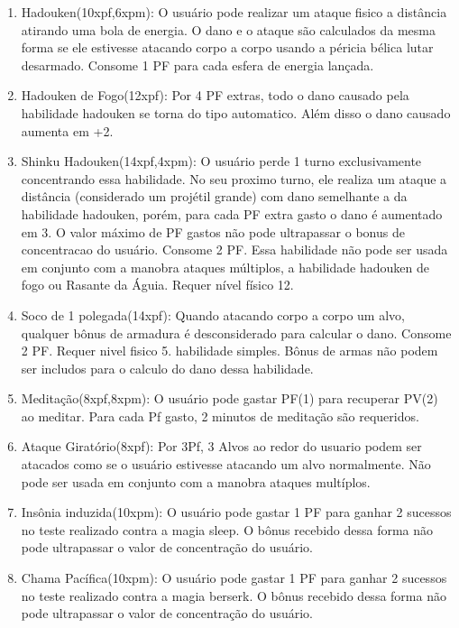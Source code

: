 \begin{enumerate}
  	\item Hadouken(10xpf,6xpm): O usuário pode realizar um ataque fisico a distância atirando uma bola de energia. O dano e o ataque são calculados da mesma forma se ele estivesse atacando corpo a corpo usando a péricia bélica lutar desarmado. Consome 1 PF para cada esfera de energia lançada. 
  
\item Hadouken de Fogo(12xpf): Por 4 PF extras, todo o dano causado pela habilidade hadouken se torna do tipo automatico. Além disso o dano causado aumenta em +2.  

  	\item Shinku Hadouken(14xpf,4xpm): O usuário perde 1 turno exclusivamente concentrando essa habilidade. No seu proximo turno, ele realiza um ataque a distância (considerado um projétil grande) com dano semelhante a da habilidade hadouken, porém, para cada PF extra gasto o dano é aumentado em 3. O valor máximo de PF gastos não pode ultrapassar o bonus de concentracao do usuário. Consome 2 PF. Essa habilidade não pode ser usada em conjunto com a manobra ataques múltiplos, a habilidade hadouken de fogo ou Rasante da Águia. Requer nível físico 12.

  	\item Soco de 1 polegada(14xpf): Quando atacando corpo a corpo um alvo, qualquer bônus de armadura é desconsiderado para calcular o dano. Consome 2 PF. Requer nivel fisico 5. habilidade simples. Bônus de armas não podem ser includos para o calculo do dano dessa habilidade.
  	
  	\item Meditação(8xpf,8xpm): O usuário pode gastar PF(1) para recuperar PV(2) ao meditar. Para cada Pf gasto, 2 minutos de meditação são requeridos. 
  
  	\item Ataque Giratório(8xpf): Por 3Pf, 3 Alvos ao redor do usuario podem ser atacados como se o usuário estivesse atacando um alvo normalmente. Não pode ser usada em conjunto com a manobra ataques multíplos.

	\item Insônia induzida(10xpm): O usuário pode gastar 1 PF para ganhar 2 sucessos no teste realizado contra a magia sleep. O bônus recebido dessa forma não pode ultrapassar o valor de concentração do usuário.

	\item Chama Pacífica(10xpm): O usuário pode gastar 1 PF para ganhar 2 sucessos no teste realizado contra a magia berserk. O bônus recebido dessa forma não pode ultrapassar o valor de concentração do usuário.  


\end{enumerate}
